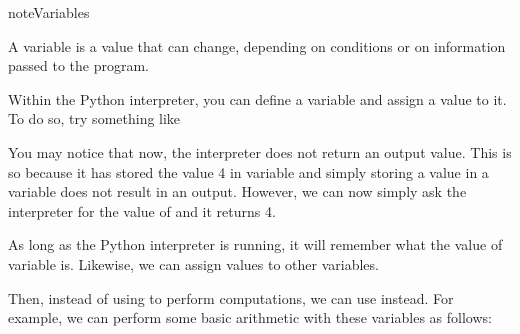 \documentclass[letterpaper,10pt,english]{jupyterBook}
\begin{document}
\begin{sphinxadmonition}{note}{Variables}

\sphinxAtStartPar
A variable is a value that can change, depending on conditions or on information passed to the program.
\end{sphinxadmonition}

\sphinxAtStartPar
Within the Python interpreter, you can define a variable and assign a value to it. To do so, try something like

\begin{sphinxVerbatim}[commandchars=\\\{\}]
   
\end{sphinxVerbatim}

\sphinxAtStartPar
You may notice that now, the interpreter does not return an output value. This is so because it has stored the value 4 in variable  and simply storing a value in a variable does not result in an output. However, we can now simply ask the interpreter for the value of  and it returns 4.

\begin{sphinxVerbatim}[commandchars=\\\{\}]
\end{sphinxVerbatim}

\sphinxAtStartPar
As long as the Python interpreter is running, it will remember what the value of variable  is. Likewise, we can assign values to other variables.

\begin{sphinxVerbatim}[commandchars=\\\{\}]
  
  
\end{sphinxVerbatim}

\sphinxAtStartPar
Then, instead of using  to perform computations, we can use  instead. For example, we can perform some basic arithmetic with these variables as follows:

\begin{sphinxVerbatim}[commandchars=\\\{\}]
\end{sphinxVerbatim}
\end{document}
